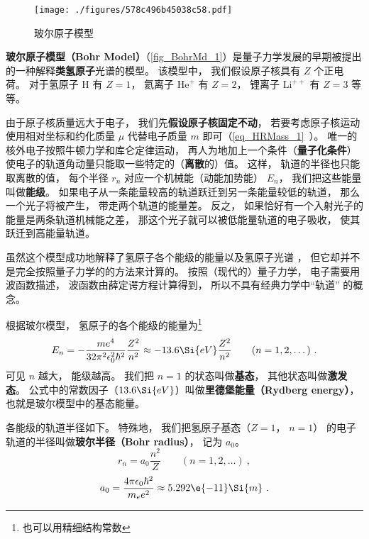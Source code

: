 

\begin{figure}[ht]
\centering
\texttt{[image: ./figures/578c496b45038c58.pdf]}
\caption{玻尔原子模型} \label{fig_BohrMd_1}
\end{figure}

\textbf{玻尔原子模型（Bohr Model）}（\autoref{fig_BohrMd_1}）是量子力学发展的早期被提出的一种解释\textbf{类氢原子}光谱的模型。 该模型中， 我们假设原子核具有 $Z$ 个正电荷。 对于氢原子 $\mathrm{H}$ 有 $Z = 1$， 氦离子 $\mathrm{He}^+$ 有 $Z = 2$， 锂离子 $\mathrm{Li}^{++}$ 有 $Z = 3$ 等等。

由于原子核质量远大于电子， 我们先\textbf{假设原子核固定不动}， 若要考虑原子核运动使用相对坐标和约化质量 $\mu$ 代替电子质量 $m$ 即可（\autoref{eq_HRMass_1}~）。
唯一的核外电子按照牛顿力学和库仑定律运动， 再人为地加上一个条件（\textbf{量子化条件}）使电子的轨道角动量只能取一些特定的（\textbf{离散}的）值。 这样， 轨道的半径也只能取离散的值， 每个半径 $r_n$ 对应一个机械能（动能加势能） $E_n$， 我们把这些能量叫做\textbf{能级}。 如果电子从一条能量较高的轨道跃迁到另一条能量较低的轨道， 那么一个光子将被产生， 带走两个轨道的能量差。 反之， 如果恰好有一个入射光子的能量是两条轨道机械能之差， 那这个光子就可以被低能量轨道的电子吸收， 使其跃迁到高能量轨道。

虽然这个模型成功地解释了氢原子各个能级的能量以及氢原子光谱%
， 但它却并不是完全按照量子力学的的方法来计算的。 按照（现代的）量子力学， 电子需要用波函数描述， 波函数由薛定谔方程计算得到， 所以不具有经典力学中“轨道” 的概念。

根据玻尔模型， 氢原子的各个能级的能量为\footnote{也可以用精细结构常数}
\begin{equation}
E_n =  - \frac{m e^4}{32 \pi^2 \epsilon_0^2 \hbar ^2} \frac{Z^2}{n^2} \approx - 13.6\Si{eV} \frac{Z^2}{n^2}
\qquad (n = 1, 2, \dots)~.
\end{equation}
可见 $n$ 越大， 能级越高。 我们把 $n = 1$ 的状态叫做\textbf{基态}， 其他状态叫做\textbf{激发态}。 公式中的常数因子（$13.6\Si{eV}$）叫做\textbf{里德堡能量（Rydberg energy）}， 也就是玻尔模型中的基态能量。

各能级的轨道半径如下。 特殊地， 我们把氢原子基态（$Z = 1$， $n = 1$） 的电子轨道的半径叫做\textbf{玻尔半径（Bohr radius）}， 记为 $a_0$。
\begin{equation}\label{eq_BohrMd_1}
r_n = a_0 \frac{n^2}{Z}
\qquad (n = 1, 2, \dots)~,
\end{equation}
\begin{equation}\label{eq_BohrMd_3}
a_0 = \frac{4\pi \epsilon_0 \hbar^2}{m_e e^2} \approx 5.292\e{-11}\Si{m}~.
\end{equation}


